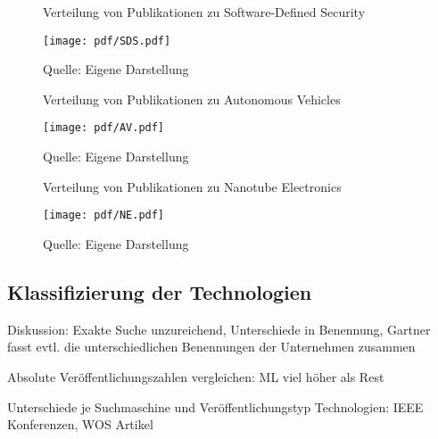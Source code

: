 \begin{figure}
\centering
\caption{Verteilung von Publikationen zu \glqq Software-Defined Security\grqq}
\texttt{[image: pdf/SDS.pdf]}
\caption*{Quelle: Eigene Darstellung}
\label{fig:sds_pub}
\end{figure}

\begin{figure}
\centering
\caption{Verteilung von Publikationen zu \glqq Autonomous Vehicles\grqq}
\texttt{[image: pdf/AV.pdf]}
\caption*{Quelle: Eigene Darstellung}
\label{fig:av_pub}
\end{figure}

\begin{figure}
\centering
\caption{Verteilung von Publikationen zu \glqq Nanotube Electronics\grqq}
\texttt{[image: pdf/NE.pdf]}
\caption*{Quelle: Eigene Darstellung}
\label{fig:ne_pub}
\end{figure}



\subsection{Klassifizierung der Technologien}




Diskussion:
Exakte Suche unzureichend, Unterschiede in Benennung, Gartner fasst evtl. die unterschiedlichen Benennungen der Unternehmen zusammen

Absolute Veröffentlichungszahlen vergleichen: ML viel höher als Rest


Unterschiede je Suchmaschine und Veröffentlichungstyp
Technologien: IEEE Konferenzen, WOS Artikel